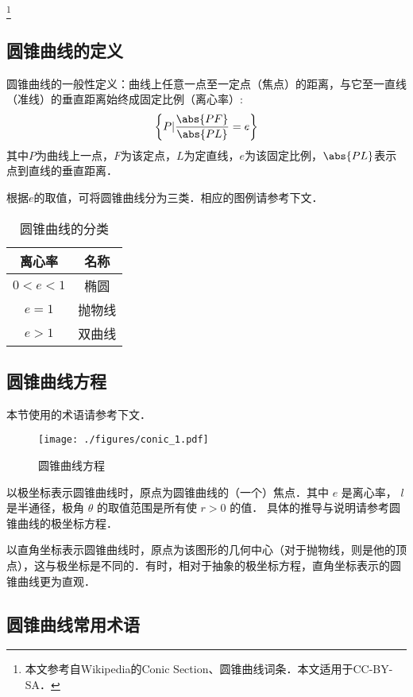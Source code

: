 
\begin{issues}
\issueDraft
\end{issues}

\footnote{本文参考自Wikipedia的Conic Section、圆锥曲线词条．本文适用于CC-BY-SA．}

\subsection{圆锥曲线的定义}
圆锥曲线的一般性定义：曲线上任意一点至一定点（焦点）的距离，与它至一直线（准线）的垂直距离始终成固定比例（离心率）:
\begin{equation}
\left \{P \vert \frac{\abs{PF}}{\abs{PL}}=e \right \}
\end{equation}
其中$P$为曲线上一点，$F$为该定点，$L$为定直线，$e$为该固定比例，$\abs{PL}$表示点到直线的垂直距离．

根据$e$的取值，可将圆锥曲线分为三类．相应的图例请参考下文．
\begin{table}[ht]
\centering
\caption{圆锥曲线的分类}\label{conic_tab2}
\begin{tabular}{|c|c|}
\hline
离心率 & 名称\\
\hline
$0<e<1$ & 椭圆\\
\hline
$e=1$ & 抛物线\\
\hline
$e>1$ & 双曲线\\
\hline
\end{tabular}
\end{table}

\subsection{圆锥曲线方程}
本节使用的术语请参考下文．
\begin{figure}[ht]
\centering
\texttt{[image: ./figures/conic\_1.pdf]}
\caption{圆锥曲线方程} \label{conic_fig1}
\end{figure}

以极坐标表示圆锥曲线时，原点为圆锥曲线的（一个）焦点．其中 $e$ 是离心率， $l$ 是半通径，极角 $\theta$ 的取值范围是所有使 $r>0$ 的值． 
具体的推导与说明请参考圆锥曲线的极坐标方程．

以直角坐标表示圆锥曲线时，原点为该图形的几何中心（对于抛物线，则是他的顶点），这与极坐标是不同的．有时，相对于抽象的极坐标方程，直角坐标表示的圆锥曲线更为直观．

\subsection{圆锥曲线常用术语}

